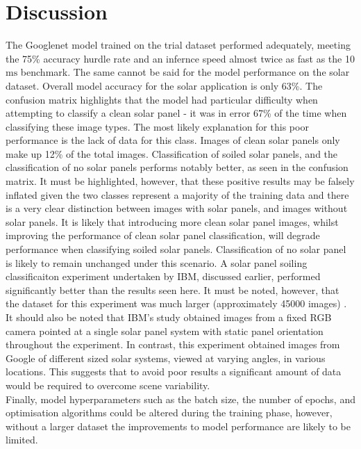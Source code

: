 \documentclass[10pt,journal,compsoc]{IEEEtran}
\begin{document}
		\section{Discussion}
		The Googlenet model trained on the trial dataset performed adequately, meeting the 75\% accuracy hurdle rate and an infernce speed almost twice as fast as the 10$\si{\milli\second}$ benchmark. The same cannot be said for the model performance on the solar dataset. Overall model accuracy for the solar application is only 63\%. The confusion matrix highlights that the model had particular difficulty when attempting to classify a clean solar panel - it was in error 67\% of the time when classifying these image types. The most likely explanation for this poor performance is the lack of data for this class. Images of clean solar panels only make up 12\% of the total images. Classification of soiled solar panels, and the classification of no solar panels performs notably better, as seen in the confusion matrix. It must be highlighted, however, that these positive results may be falsely inflated given the two classes represent a majority of the training data and there is a very clear distinction between images with solar panels, and images without solar panels. It is likely that introducing more clean solar panel images, whilst improving the performance of clean solar panel classification, will degrade performance when classifying soiled solar panels. Classification of no solar panel is likely to remain unchanged under this scenario. A solar panel soiling classificaiton experiment undertaken by IBM, discussed earlier, performed significantly better than the results seen here. It must be noted, however, that the dataset for this experiment was much larger (approximately 45000 images) \cite{Mehta:2018}. It should also be noted that IBM's study obtained images from a fixed RGB camera pointed at a single solar panel system with static panel orientation throughout the experiment. In contrast, this experiment obtained images from Google of different sized solar systems, viewed at varying angles, in various locations. This suggests that to avoid poor results a significant amount of data would be required to overcome scene variability.\\
		
		Finally, model hyperparameters such as the batch size, the number of epochs, and optimisation algorithms could be altered during the training phase, however, without a larger dataset the improvements to model performance are likely to be limited.
			
\end{document}
